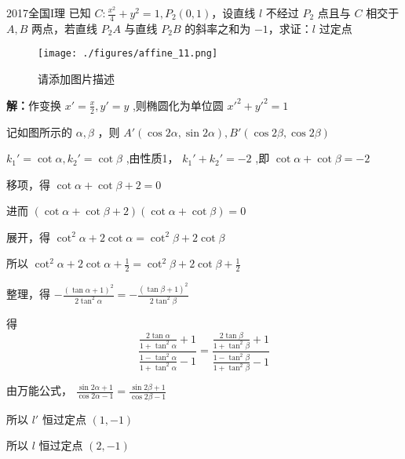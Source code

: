 \begin{example}{2017全国I理}
已知 $\displaystyle{C:\frac{x^2}4+y^2=1,P_2(0,1)}$，设直线 $\displaystyle{l}$ 不经过 $\displaystyle{P_2}$ 点且与 $\displaystyle{C}$ 相交于 $\displaystyle{A,B}$ 两点，若直线 $\displaystyle{P_2A}$ 与直线 $\displaystyle{P_2B}$ 的斜率之和为 $\displaystyle{-1}$，求证：$\displaystyle{l}$ 过定点
\begin{figure}[ht]
\centering
\texttt{[image: ./figures/affine\_11.png]}
\caption{请添加图片描述} \label{affine_fig11}
\end{figure}
\textbf{解：}作变换 $\displaystyle{x'=\frac{x}{2},y'=y}$ ,则椭圆化为单位圆 $\displaystyle{x'^2+y'^2=1}$

记如图所示的 $\displaystyle{\alpha,\beta}$ ，则 $\displaystyle{A'(\cos2\alpha,\sin2\alpha),B'(\cos2\beta,\cos2\beta)}$

$\displaystyle{k_1'=\cot{\alpha},k_2'=\cot{\beta}}$ ,由性质1， $\displaystyle{k_1'+k_2'=-2}$ ,即 $\displaystyle{\cot{\alpha}+\cot{\beta}=-2}$

移项，得 $\displaystyle{\cot\alpha+\cot \beta+2=0}$

进而 $\displaystyle{(\cot\alpha+\cot \beta+2)(\cot \alpha+\cot\beta)=0}$

展开，得 $\displaystyle{\cot^2\alpha+2\cot\alpha=\cot^2\beta+2\cot\beta}$

所以 $\displaystyle{\cot^2\alpha+2\cot\alpha+\frac{1}{2}=\cot^2\beta+2\cot\beta+\frac{1}{2}}$

整理，得 $\displaystyle{-\frac{(\tan\alpha+1)^2}{2\tan^2\alpha}=-\frac{(\tan\beta+1)^2}{2\tan^2\beta}}$

得 
$$\frac{\frac{2\tan\alpha}{1+\tan^2\alpha}+1}{\frac{1-\tan^2\alpha}{1+\tan^2\alpha}-1}=\frac{\frac{2\tan\beta}{1+\tan^2\beta}+1}{\frac{1-\tan^2\beta}{1+\tan^2\beta}-1}$$

由万能公式， $\displaystyle{\frac{\sin2\alpha+1}{\cos2\alpha-1}=\frac{\sin2\beta+1}{\cos2\beta-1}}$

所以 $\displaystyle{l'}$ 恒过定点 $\displaystyle{(1,-1)}$

所以 $\displaystyle{l}$ 恒过定点 $\displaystyle{(2,-1)}$ 
\end{example}
